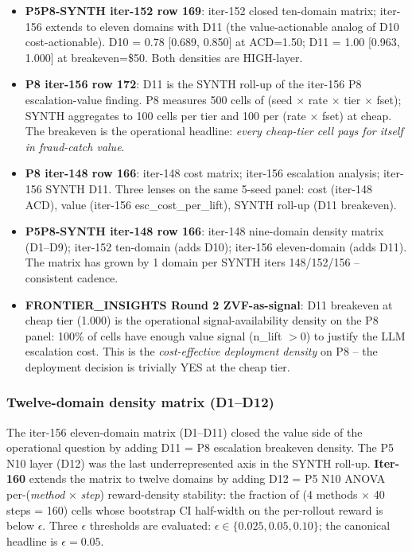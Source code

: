 \documentclass{article}
\begin{document}
\begin{itemize}
  \item \textbf{P5P8-SYNTH iter-152 row 169}: iter-152 closed
    ten-domain matrix; iter-156 extends to eleven domains with D11
    (the value-actionable analog of D10 cost-actionable).  D10 = 0.78
    [0.689, 0.850] at ACD=1.50; D11 = 1.00 [0.963, 1.000] at
    breakeven=\$50.  Both densities are HIGH-layer.
  \item \textbf{P8 iter-156 row 172}: D11 is the SYNTH roll-up of the
    iter-156 P8 escalation-value finding.  P8 measures 500 cells of
    (seed $\times$ rate $\times$ tier $\times$ fset); SYNTH aggregates
    to 100 cells per tier and 100 per (rate $\times$ fset) at cheap.
    The breakeven is the operational headline: \emph{every cheap-tier
    cell pays for itself in fraud-catch value}.
  \item \textbf{P8 iter-148 row 166}: iter-148 cost matrix; iter-156
    escalation analysis; iter-156 SYNTH D11.  Three lenses on the
    same 5-seed panel: cost (iter-148 ACD), value (iter-156
    esc\_cost\_per\_lift), SYNTH roll-up (D11 breakeven).
  \item \textbf{P5P8-SYNTH iter-148 row 166}: iter-148 nine-domain
    density matrix (D1--D9); iter-152 ten-domain (adds D10);
    iter-156 eleven-domain (adds D11).  The matrix has grown by 1
    domain per SYNTH iters 148/152/156 -- consistent cadence.
  \item \textbf{FRONTIER\_INSIGHTS Round 2 ZVF-as-signal}: D11
    breakeven at cheap tier (1.000) is the operational
    signal-availability density on the P8 panel: 100\% of cells have
    enough value signal (n\_lift $> 0$) to justify the LLM escalation
    cost.  This is the \emph{cost-effective deployment density} on
    P8 -- the deployment decision is trivially YES at the cheap
    tier.
\end{itemize} 

\subsubsection{Twelve-domain density matrix (D1--D12)}
\label{sec:synth-iter160}

The iter-156 eleven-domain matrix (D1--D11) closed the value side of the
operational question by adding D11 = P8 escalation breakeven density. The
P5 N10 layer (D12) was the last underrepresented axis in the SYNTH
roll-up. \textbf{Iter-160} extends the matrix to twelve domains by adding
D12 = P5 N10 ANOVA per-(\textit{method} $\times$ \textit{step})
reward-density stability: the fraction of (4 methods $\times$ 40 steps = 160)
cells whose bootstrap CI half-width on the per-rollout reward is below
$\epsilon$. Three $\epsilon$ thresholds are evaluated:
$\epsilon \in \{0.025, 0.05, 0.10\}$; the canonical headline is
$\epsilon = 0.05$.
\end{document}
